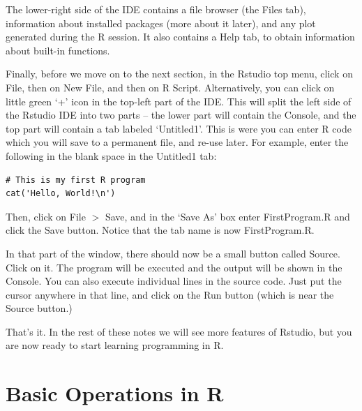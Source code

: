 \documentclass[11pt]{article}
\theoremstyle{definition}
\begin{document}
The lower-right side of the IDE contains a file browser (the Files tab), information about installed packages (more about it later), and any plot generated during the R session. It also contains a Help tab, to obtain information about built-in functions.

Finally, before we move on to the next section, in the Rstudio top menu, click on File, then on New File, and then on R Script. Alternatively, you can click on little green `+' icon in the top-left part of the IDE. This will split the left side of the Rstudio IDE into two parts -- the lower part will contain the Console, and the top part will contain a tab labeled `Untitled1'. This is were you can enter R code which you will save to a permanent file, and re-use later.
For example, enter the following in the blank space in the Untitled1 tab:
\begin{tcolorbox}[colback=gray!20,boxrule=0pt,frame hidden]
\begin{verbatim}
# This is my first R program
cat('Hello, World!\n')
\end{verbatim}
\end{tcolorbox}
Then, click on File $>$ Save, and in the `Save As' box enter FirstProgram.R and click the Save button.
Notice that the tab name is now FirstProgram.R.

In that part of the window, there should now be a small button called Source. Click on it. The program will be executed and the output will be shown in the Console. You can also execute individual lines in the source code. Just put the cursor anywhere in that line, and click on the Run button (which is near the Source button.)

That's it. In the rest of these notes we will see more features of Rstudio, but you are now ready to start learning programming in R.

\section{Basic Operations in R}
\end{document}
